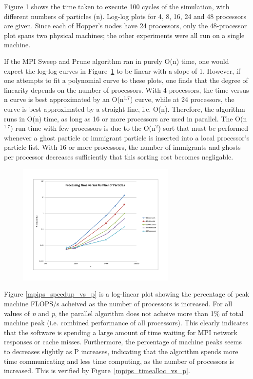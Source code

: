 \documentclass[11pt]{article} %
\begin{document}
Figure \ref{mpips_time_vs_n} shows the time taken to execute 100 cycles of the simulation, with different numbers of particles (n). Log-log plots for 4, 8, 16, 24 and 48 processors are given. Since each of Hopper's nodes have 24 processors, only the 48-processor plot spans two physical machines; the other experiments were all run on a single machine.

If the MPI Sweep and Prune algorithm ran in purely O(n) time, one would expect the log-log curves in Figure~\ref{mpips_time_vs_n} to be linear with a slope of 1. However, if one attempts to fit a polynomial curve to these plots, one finds that the degree of linearity depends on the number of processors. With 4 processors, the time versus n curve is best approximated by an O(n$^{1.7}$) curve, while at 24 processors, the curve is best approximated by a straight line, i.e. O(n). Therefore, the algorithm runs in O(n) time, as long as 16 or more processors are used in parallel. The O(n$^{1.7}$) run-time with few processors is due to the O(n$^{2}$) sort that must be performed whenever a ghost particle or immigrant particle is inserted into a local processor's particle list. With 16 or more processors, the number of immigrants and ghosts per processor decreases sufficiently that this sorting cost becomes negligable.

\begin{figure}[!h]
\centering
\includegraphics*[width=0.7\textwidth, viewport= 70 70 730 550]{figures/mpips_time_vs_n}
\caption{}
\label{mpips_time_vs_n}
\end{figure}

Figure \ref{mpips_speedup_vs_p} is a log-linear plot showing the percentage of peak machine FLOPS/s acheived as the number of processors is increased. For all values of {\em n} and {\em p}, the parallel algorithm does not acheive more than 1\% of total machine peak (i.e. combined performance of all processors). This clearly indicates that the software is spending a large amount of time waiting for MPI network responses or cache misses. Furthermore, the percentage of machine peaks seems to decreases slightly as P increases, indicating that the algorithm spends more time communicating and less time computing, as the number of processors is increased. This is verified by Figure~\ref{mpips_timealloc_vs_p}.
\end{document}
